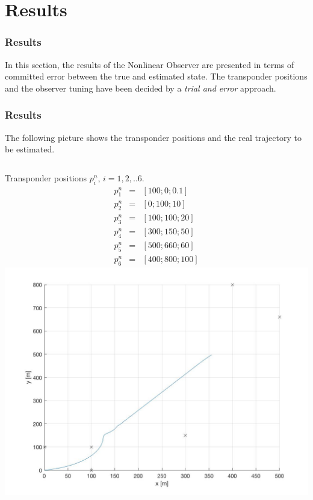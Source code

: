 \documentclass{beamer}
\begin{document}
\section{Results}
    \begin{frame}
        \frametitle{Results}
        In this section, the results of the Nonlinear Observer
        are presented in terms of committed error between the
        true and estimated state.
        The transponder positions and the observer
        tuning have been decided by
        a \textit{trial and error} approach.
    \end{frame}

 \begin{frame}
        \frametitle{Results}
        The following picture shows the transponder positions
        and the real trajectory to be estimated.
        
        \begin{columns}
        Transponder positions $p_i^n$, $i=1,2,.. 6$.
        $$
        \begin{matrix}
            p_1^n& =& [100;0;0.1] \\
            p_2^n& =& [0;100;10] \\
            p_3^n &=& [100;100;20] \\
            p_4^n &=& [300;150;50] \\
            p_5^n &=& [500;660;60] \\
            p_6^n &=& [400;800;100]
        \end{matrix}
        $$
			\includegraphics[scale=0.15]{true_traj.jpg}
		\end{columns}
        
    \end{frame}
\end{document}
